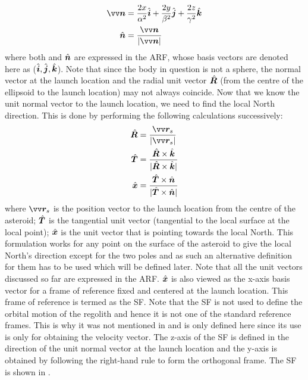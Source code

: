 \begin{align}
    \bv{n} &= \frac{2x}{\alpha^2}\buvec{i} + \frac{2y}{\beta^2}\buvec{j} + \frac{2z}{\gamma^2}\buvec{k}
    \label{eqn:surface_normal_vector} \\
    \buvec{n} &= \frac{\bv{n}}{|\bv{n}|}
    \label{eqn:unit_normal}
\end{align}
where both  and $\hat{\bm{n}}$ are expressed in the \gls{ARF}, whose basis vectors are denoted here as ($\hat{\bm{i}},\hat{\bm{j}},\hat{\bm{k}}$). Note that since the body in question is not a sphere, the normal vector at the launch location and the radial unit vector $\hat{\bm{R}}$ (from the centre of the ellipsoid to the launch location) may not always coincide. Now that we know the unit normal vector to the launch location, we need to find the local North direction. This is done by performing the following calculations successively:
\begin{align}
    \buv{R} &= \frac{\bv{r}_s}{|\bv{r}_s|} \\
    \buv{T} &= \frac{\buv{R} \times \buv{k}}{|\buv{R} \times \buv{k}|} \\
    \buv{x} &= \frac{\buv{T} \times \buv{n}}{|\buv{T} \times \buv{n}|} \\
    \label{eqn:surface_frame_xBasis}
\end{align}
where $\bv{r}_s$ is the position vector to the launch location from the centre of the asteroid; $\hat{\bm{T}}$ is the tangential unit vector (tangential to the local surface at the local point); $\hat{\bm{x}}$ is the unit vector that is pointing towards the local North. This formulation works for any point on the surface of the asteroid to give the local North's direction except for the two poles and as such an alternative definition for them has to be used which will be defined later. Note that all the unit vectors discussed so far are expressed in the \gls{ARF}.
%
\newline\newline
%
$\hat{\bm{x}}$ is also viewed as the x-axis basis vector for a frame of reference fixed and centered at the launch location. This frame of reference is termed as the \gls{SF}. Note that the \gls{SF} is not used to define the orbital motion of the regolith and hence it is not one of the standard reference frames. This is why it was not mentioned in  and is only defined here since its use is only for obtaining the velocity vector. The z-axis of the \gls{SF} is defined in the direction of the unit normal vector at the launch location and the y-axis is obtained by following the right-hand rule to form the orthogonal frame. The \gls{SF} is shown in .
